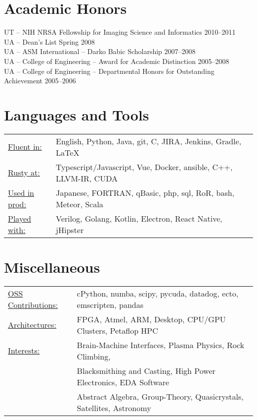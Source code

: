 \documentclass{res}
\begin{document}
\begin{resume}
\section{Academic Honors}
UT -- NIH NRSA Fellowship for Imaging Science and Informatics \hfill 2010--2011 \\
UA -- Dean’s List \hfill Spring 2008 \\
UA -- ASM International -- Darko Babic Scholarship \hfill 2007--2008 \\
UA -- College of Engineering -- Award for Academic Distinction \hfill 2005--2008 \\
UA -- College of Engineering -- Departmental Honors for Outstanding Achievement \hfill 2005--2006

\section{Languages and Tools}
 \begin{tabular}{l p{5.5in}}
   \underline{Fluent in:}    & English, Python, Java, git, C, JIRA, Jenkins, Gradle, \LaTeX \\
   \underline{Rusty at:}     & Typescript/Javascript, Vue, Docker, ansible, C++, LLVM-IR, CUDA \\
   \underline{Used in prod:} & Japanese, FORTRAN, qBasic, php, sql, RoR, bash, Meteor, Scala \\
   \underline{Played with:}  & Verilog, Golang, Kotlin, Electron, React Native, jHipster
 \end{tabular}

\section{Miscellaneous}
  \begin{tabular}{l p{5.5in}}
    \underline{OSS Contributions:} & cPython, numba, scipy, pycuda, datadog, ecto, emscripten, pandas  \\
    \underline{Architectures:}     & FPGA, Atmel, ARM, Desktop, CPU/GPU Clusters, Petaflop HPC \\
    \underline{Interests:}         & Brain-Machine Interfaces, Plasma Physics, Rock Climbing, \\
                                   & Blacksmithing and Casting, High Power Electronics, EDA Software \\
                                   & Abstract Algebra, Group-Theory, Quasicrystals, Satellites, Astronomy
 \end{tabular}

\end{resume}
\end{document}
